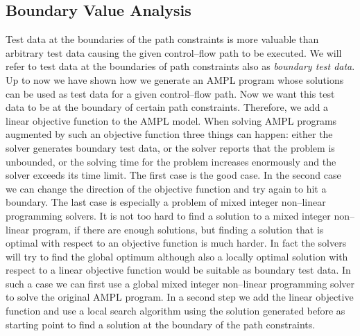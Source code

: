 \documentclass[runningheads,a4paper]{llncs}%
\begin{document}
\subsection{Boundary Value Analysis}%
\label{sec:BoundaryValueAnalysis}%
Test data at the boundaries of the path constraints is more valuable than arbitrary test data causing the given control--flow path to be executed. We will refer to test data at the boundaries of path constraints also as \emph{boundary test data}. Up to now we have shown how we generate an AMPL program whose solutions can be used as test data for a given control--flow path. Now we want this test data to be at the boundary of certain path constraints. Therefore, we add a linear objective function to the AMPL model. When solving AMPL programs augmented by such an objective function three things can happen: either the solver generates boundary test data, or the solver reports that the problem is unbounded, or the solving time for the problem increases enormously and the solver exceeds its time limit. The first case is the good case. In the second case we can change the direction of the objective function and try again to hit a boundary. The last case is especially a problem of mixed integer non--linear programming solvers. It is not too hard to find a solution to a mixed integer non--linear program, if there are enough solutions, but finding a solution that is optimal with respect to an objective function is much harder. In fact the solvers will try to find the global optimum although also a locally optimal solution with respect to a linear objective function would be suitable as boundary test data. In such a case we can first use a global mixed integer non--linear programming solver to solve the original AMPL program. In a second step we add the linear objective function and use a local search algorithm using the solution generated before as starting point to find a solution at the boundary of the path constraints.
\end{document}
